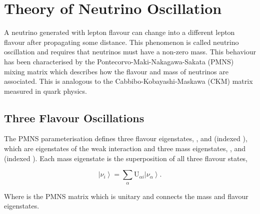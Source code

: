 \section{Theory of Neutrino Oscillation}
\label{sec:NeutrinoOscillationPhysics_EvidenceForNeutrinoOscillation}

A neutrino generated with lepton flavour \quickmath{\alpha} can change into a different lepton flavour \quickmath{\beta} after propagating some distance. This phenomenon is called neutrino oscillation and requires that neutrinos must have a non-zero mass. This behaviour has been characterised by the Pontecorvo-Maki-Nakagawa-Sakata (PMNS) \cite{p1,p2,km} mixing matrix which describes how the flavour and mass of neutrinos are associated. This is analogous to the Cabbibo-Kobayashi-Maskawa (CKM) \cite{cabbibo} matrix measured in quark physics.

\subsection{Three Flavour Oscillations}
\label{sec:NeutrinoOscillationPhysics_3FlavourOsc}

The PMNS parameterisation defines three flavour eigenstates, , \quickmath{\nu_{\mu}} and \quickmath{\nu_{\tau}} (indexed \quickmath{\nu_{\alpha}}), which are eigenstates of the weak interaction and three mass eigenstates, ,  and  (indexed ). Each mass eigenstate is the superposition of all three flavour states,

\begin{equation}
  \label{eq:NeutrinoOscillationPhysics_Superposition}
  \left|\nu_{i}\right> = \sum_{\alpha}\mathrm{U}_{\alpha i}\left|\nu_{\alpha}\right>.
\end{equation}

Where  is the  PMNS matrix which is unitary and connects the mass and flavour eigenstates.

%

%

